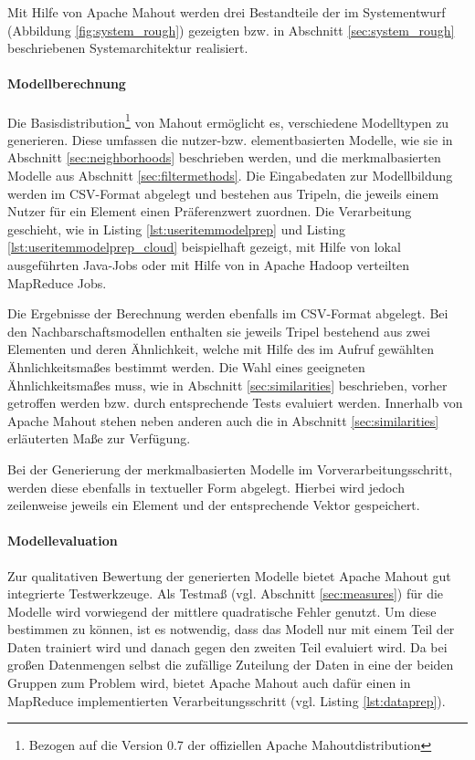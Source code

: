 Mit Hilfe von Apache Mahout werden drei Bestandteile der im Systementwurf (Abbildung \ref{fig:system_rough}) gezeigten bzw. in Abschnitt \ref{sec:system_rough} beschriebenen Systemarchitektur realisiert.

\paragraph{Modellberechnung} Die Basisdistribution\footnote{Bezogen auf die Version 0.7 der offiziellen Apache Mahoutdistribution} von Mahout ermöglicht es, verschiedene Modelltypen zu generieren. Diese umfassen die nutzer-bzw. elementbasierten Modelle, wie sie in Abschnitt \ref{sec:neighborhoods} beschrieben werden, und die merkmalbasierten Modelle aus Abschnitt \ref{sec:filtermethods}. Die Eingabedaten zur Modellbildung werden im CSV-Format abgelegt und bestehen aus Tripeln, die jeweils einem Nutzer für ein Element einen Präferenzwert zuordnen. Die Verarbeitung geschieht, wie in Listing \ref{lst:useritemmodelprep} und Listing \ref{lst:useritemmodelprep_cloud} beispielhaft gezeigt, mit Hilfe von lokal ausgeführten Java-Jobs oder mit Hilfe von in Apache Hadoop verteilten MapReduce Jobs.

 
 

Die Ergebnisse der Berechnung werden ebenfalls im CSV-Format abgelegt. Bei den Nachbarschaftsmodellen enthalten sie jeweils Tripel bestehend aus zwei Elementen und deren Ähnlichkeit, welche mit Hilfe des im Aufruf gewählten Ähnlichkeitsmaßes bestimmt werden. Die Wahl eines geeigneten Ähnlichkeitsmaßes muss, wie in Abschnitt \ref{sec:similarities} beschrieben, vorher getroffen werden bzw. durch entsprechende Tests evaluiert werden. Innerhalb von Apache Mahout stehen neben anderen auch die in Abschnitt \ref{sec:similarities} erläuterten Maße zur Verfügung.

Bei der Generierung der merkmalbasierten Modelle im Vorverarbeitungsschritt, werden diese ebenfalls in textueller Form abgelegt. Hierbei wird jedoch zeilenweise jeweils ein Element und der entsprechende Vektor gespeichert.

\paragraph{Modellevaluation} Zur qualitativen Bewertung der generierten Modelle bietet Apache Mahout gut integrierte Testwerkzeuge. Als Testmaß (vgl. Abschnitt \ref{sec:measures}) für die Modelle wird vorwiegend der mittlere quadratische Fehler genutzt. Um diese bestimmen zu können, ist es notwendig, dass das Modell nur mit einem Teil der Daten trainiert wird und danach gegen den zweiten Teil evaluiert wird. Da bei großen Datenmengen selbst die zufällige Zuteilung der Daten in eine der beiden Gruppen zum Problem wird, bietet Apache Mahout auch dafür einen in MapReduce implementierten Verarbeitungsschritt (vgl. Listing \ref{lst:dataprep}).

